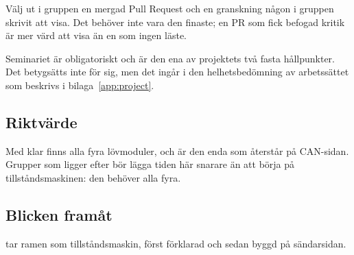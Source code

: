 Välj ut i gruppen en mergad Pull Request och en granskning någon i gruppen skrivit att visa. Det
behöver inte vara den finaste; en PR som fick befogad kritik är mer värd att visa än en som ingen
läste.

Seminariet är obligatoriskt och är den ena av projektets två fasta hållpunkter. Det betygsätts inte
för sig, men det ingår i den helhetsbedömning av arbetssättet som beskrivs i
bilaga~\ref{app:project}.

\subsection*{Riktvärde}
Med  klar finns alla fyra lövmoduler, och  är den enda som
återstår på CAN-sidan. Grupper som ligger efter bör lägga tiden här snarare än att börja på
tillståndsmaskinen: den behöver alla fyra.

\subsection*{Blicken framåt}
 tar ramen som tillståndsmaskin, först förklarad och sedan byggd på sändarsidan.
